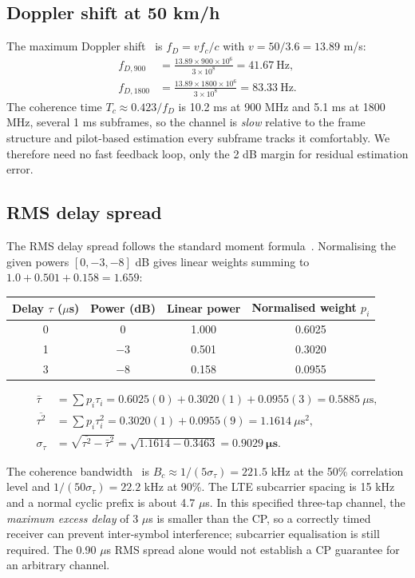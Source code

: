 \documentclass[9pt,a4paper]{extarticle}
\newcommand{\keym}[1]{\mathbf{#1}}
\begin{document}
\subsection{Doppler shift at 50 km/h}
The maximum Doppler shift~\cite{rappaport} is $f_D = v f_c / c$ with $v = 50/3.6 = 13.89$ m/s:
\begin{align*}
f_{D,900}  &= \frac{13.89 \times 900\times10^{6}}{3\times10^{8}} = 41.67\ \text{Hz},\\
f_{D,1800} &= \frac{13.89 \times 1800\times10^{6}}{3\times10^{8}} = 83.33\ \text{Hz}.
\end{align*}
The coherence time $T_c\approx0.423/f_D$ is 10.2 ms at 900 MHz and 5.1 ms at 1800 MHz,
several 1 ms subframes, so the channel is \emph{slow} relative to the frame structure and
pilot-based estimation every subframe tracks it comfortably. We therefore need no fast feedback
loop, only the 2 dB margin for residual estimation error.

\subsection{RMS delay spread}
The RMS delay spread follows the standard moment formula~\cite{rappaport}. Normalising the given powers $[0,-3,-8]$ dB gives linear weights summing to
$1.0+0.501+0.158=1.659$:

\begin{center}\small
\begin{tabular}{@{}cccc@{}}
\toprule
Delay $\tau$ ($\mu$s) & Power (dB) & Linear power & Normalised weight $p_i$ \\
\midrule
0 & 0 & 1.000 & 0.6025 \\
1 & $-3$ & 0.501 & 0.3020 \\
3 & $-8$ & 0.158 & 0.0955 \\
\bottomrule
\end{tabular}
\end{center}

\begin{align*}
\bar\tau &= \textstyle\sum p_i\tau_i = 0.6025(0)+0.3020(1)+0.0955(3) = 0.5885\ \mu\text{s},\\
\overline{\tau^2} &= \textstyle\sum p_i\tau_i^2 = 0.3020(1)+0.0955(9) = 1.1614\ \mu\text{s}^2,\\
\sigma_\tau &= \sqrt{\overline{\tau^2}-\bar\tau^2}
= \sqrt{1.1614-0.3463} = \keym{0.9029\ \mu\text{s}}.
\end{align*}

The coherence bandwidth~\cite{rappaport} is $B_c\approx1/(5\sigma_\tau)=221.5$ kHz at the 50\% correlation level
and $1/(50\sigma_\tau)=22.2$ kHz at 90\%. The LTE subcarrier spacing is 15 kHz and a normal
cyclic prefix is about 4.7 $\mu$s. In this specified three-tap channel, the
\emph{maximum excess delay} of 3 $\mu$s is smaller than the CP, so a correctly
timed receiver can prevent inter-symbol interference; subcarrier equalisation is still required. The 0.90 $\mu$s RMS spread alone would not establish a CP guarantee for an arbitrary channel.
\end{document}

